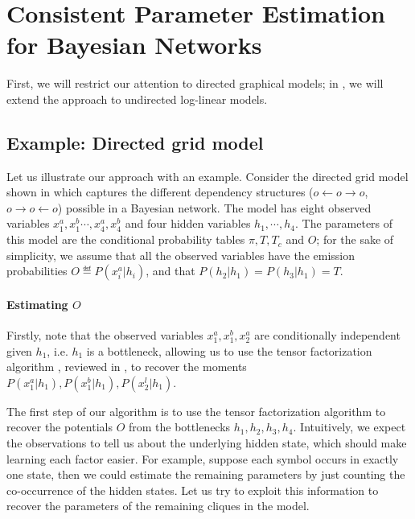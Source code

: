 \section{Consistent Parameter Estimation for Bayesian Networks}
\label{sec:piecewise}


First, we will restrict our attention to directed graphical models; in
, we will extend the approach to undirected
log-linear models.

\subsection{Example: Directed grid model}

Let us illustrate our approach with an example. 
Consider the directed grid model shown in  which
  captures the different dependency structures ($o \gets o \to o$, $o \to
  o \gets o$) possible in a Bayesian network.
The model has eight observed variables $x^a_1, x^b_1 \cdots, x^a_4, x^b_4$ and four
  hidden variables $h_1, \cdots, h_4$.
The parameters of this model are the conditional probability tables
  $\pi, T, T_c$ and $O$; for the sake of simplicity, we assume that all
  the observed variables have the emission probabilities $O \eqdef P(x^a_i
  | h_i)$, and that $P(h_2 | h_1) = P(h_3 | h_1) = T$.

\paragraph{Estimating $O$}

Firstly, note that the observed variables $x^a_1, x^b_1, x^a_2$ are
  conditionally independent given $h_1$, i.e. $h_1$ is a bottleneck,
  allowing us to use the tensor factorization algorithm
  \cite{anandkumar13tensor}, reviewed in , to
  recover the moments $P(x^a_1|h_1), P(x^b_1|h_1), P(x^l_2|h_1)$. 

The first step of our algorithm is to use the tensor factorization
  algorithm to recover the potentials $O$ from the bottlenecks $h_1,
  h_2, h_3, h_4$. 
Intuitively, we expect the observations to tell us about the underlying
  hidden state, which should make learning each factor easier. 
For example, suppose each symbol occurs in exactly one state, then we
  could estimate the remaining parameters by just counting the
  co-occurrence of the hidden states.
Let us try to exploit this information to recover the parameters of the
  remaining cliques in the model.

